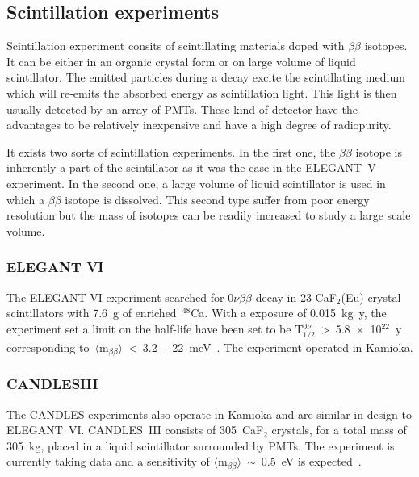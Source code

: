 \documentclass[main.tex]{subfiles}
\begin{document}
\subsection{Scintillation experiments}


\NI Scintillation experiment consits of scintillating materials doped with $\beta\beta$ isotopes. It can be either in an organic crystal form or on large volume of liquid scintillator. The emitted particles during a decay excite the scintillating medium which will re-emits the absorbed energy as scintillation light. This light is then usually detected by an array of PMTs. These kind of detector have the advantages to be relatively inexpensive and have a high degree of radiopurity. 


\bigskip


\NI It exists two sorts of scintillation experiments. In the first one, the $\beta\beta$ isotope is inherently a part of the scintillator as it was the case in the ELEGANT~V experiment. In the second one, a large volume of liquid scintillator is used in which a $\beta\beta$ isotope is dissolved. This second type suffer from poor energy resolution but the mass of isotopes can be readily increased to study a large scale volume.



\subsubsection{ELEGANT VI}


\NI The ELEGANT VI experiment searched for 0$\nu\beta\beta$ decay in 23 CaF$_\text{2}$(Eu) crystal scintillators with 7.6~g of enriched~$^{\text{48}}$Ca. With a exposure of 0.015~kg~y, the experiment set a limit on the half-life have been set to be T$_{\text{1/2}}^{0\nu}$~>~5.8~$\times$~10$^{\text{22}}$~y corresponding to~$\langle \text{m}_{\beta\beta} \rangle$~<~3.2~-~22~meV~\cite{ELEGANTVI}. The experiment operated in Kamioka. \\


\subsubsection{CANDLESIII}


\NI The CANDLES experiments also operate in Kamioka and are similar in design to ELEGANT~VI. CANDLES~III consists of 305~CaF$_\text{2}$ crystals, for a total mass of 305~kg, placed in a liquid scintillator surrounded by PMTs. The experiment is currently taking data and a sensitivity of $\langle \text{m}_{\beta\beta} \rangle$~$\sim$~0.5~eV is expected~\cite{CANDLESIII}.
\end{document}

